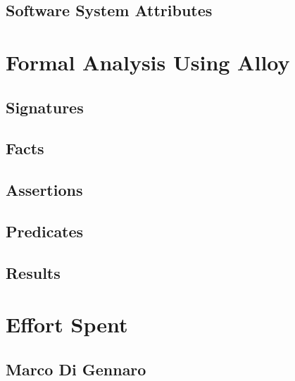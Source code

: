\documentclass[10pt,openany]{book}
\begin{document}
	\section{Software System Attributes}

		

\chapter{Formal Analysis Using Alloy}\label{chapt:sum}



	\section{Signatures}

		

	\section{Facts}

		

	\section{Assertions}

		

	\section{Predicates}

		

	\section{Results}

		

\chapter{Effort Spent}\label{chapt:sum}

	\section{Marco Di Gennaro}
\end{document}
